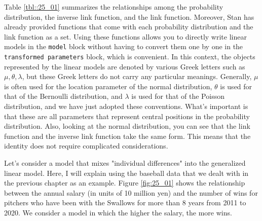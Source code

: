 \documentclass{ltjsbook}
\begin{document}
Table \ref{tbl::25_01} summarizes the relationships among the probability distribution, the inverse link function, and the link function. Moreover, Stan has already provided functions that come with each probability distribution and the link function as a set. Using these functions allows you to directly write linear models in the \verb|model| block without having to convert them one by one in the \verb|transformed parameters| block, which is convenient. In this context, the objects represented by the linear models are denoted by various Greek letters such as $\mu, \theta, \lambda$, but these Greek letters do not carry any particular meanings. Generally, $\mu$ is often used for the location parameter of the normal distribution, $\theta$ is used for that of the Bernoulli distribution, and $\lambda$ is used for that of the Poisson distribution, and we have just adopted these conventions. What's important is that these are all parameters that represent central positions in the probability distribution. Also, looking at the normal distribution, you can see that the link function and the inverse link function take the same form. This means that the identity does not require complicated considerations.



Let's consider a model that mixes "individual differences" into the generalized linear model. Here, I will explain using the baseball data that we dealt with in the previous chapter as an example.
Figure \ref{fig:25_01} shows the relationship between the annual salary (in units of 10 million yen) and the number of wins for pitchers who have been with the Swallows for more than 8 years from 2011 to 2020. We consider a model in which the higher the salary, the more wins.
\end{document}
